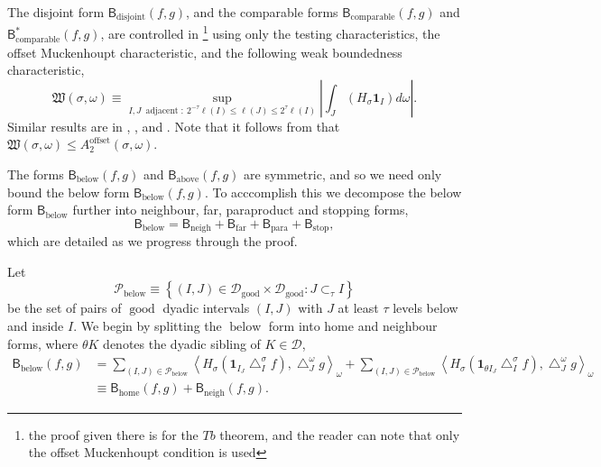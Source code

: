\documentclass{amsart}%
\theoremstyle{plain}
\numberwithin{equation}{section}
\begin{document}
The disjoint form $\mathsf{B}_{\operatorname*{disjoint}}\left(  f,g\right)  $,
and the comparable forms $\mathsf{B}_{\operatorname*{comparable}}\left(
f,g\right)  $ and $\mathsf{B}_{\operatorname*{comparable}}^{\ast}\left(
f,g\right)  $, are controlled in \cite[Section 4]{SaShUr12}\footnote{the proof
given there is for the $Tb$ theorem, and the reader can note that only the
offset Muckenhoupt condition is used} using only the testing characteristics,
the offset Muckenhoupt characteristic, and the following weak boundedness
characteristic,%
\[
\mathfrak{W}\left(  \sigma,\omega\right)  \equiv\sup
_{I,J\ \operatorname*{adjacent}:\ 2^{-\tau}\ell\left(  I\right)  \leq
\ell\left(  J\right)  \leq2^{\tau}\ell\left(  I\right)  }\left\vert \int
_{J}\left(  H_{\sigma}\mathbf{1}_{I}\right)  d\omega\right\vert .
\]
Similar results are in \cite{NTV3}, \cite{LaSaShUr3}, and \cite{Hyt2}. Note
that it follows from \cite[Lemma 2.4]{Hyt2} that $\mathfrak{W}\left(
\sigma,\omega\right)  \leq A_{2}^{\operatorname*{offset}}\left(  \sigma
,\omega\right)  $.

The forms $\mathsf{B}_{\operatorname{below}}\left(  f,g\right)  $ and
$\mathsf{B}_{\operatorname{above}}\left(  f,g\right)  $ are symmetric, and so
we need only bound the below form $\mathsf{B}_{\operatorname{below}}\left(
f,g\right)  $. To acccomplish this we decompose the below form $\mathsf{B}%
_{\operatorname{below}}$ further into neighbour, far, paraproduct and stopping
forms,%
\[
\mathsf{B}_{\operatorname{below}}=\mathsf{B}_{\operatorname{neigh}}%
+\mathsf{B}_{\operatorname{far}}+\mathsf{B}_{\operatorname*{para}}%
+\mathsf{B}_{\operatorname*{stop}},
\]
which are detailed as we progress through the proof.

Let%
\[
\mathcal{P}_{\operatorname{below}}\equiv\left\{  \left(  I,J\right)
\in\mathcal{D}_{\operatorname{good}}\times\mathcal{D}_{\operatorname{good}%
}:J\subset_{\tau}I\right\}
\]
be the set of pairs of $\operatorname{good}$ dyadic intervals $\left(
I,J\right)  $ with $J$ at least $\tau$ levels below and inside $I$. We begin
by splitting the $\operatorname{below}$ form into home and neighbour forms,
where $\theta K$ denotes the dyadic sibling of $K\in\mathcal{D}$,%
\begin{align*}
\mathsf{B}_{\operatorname{below}}\left(  f,g\right)   & =\sum_{\left(
I,J\right)  \in\mathcal{P}_{\operatorname{below}}}\left\langle H_{\sigma
}\left(  \mathbf{1}_{I_{J}}\bigtriangleup_{I}^{\sigma}f\right)
,\bigtriangleup_{J}^{\omega}g\right\rangle _{\omega}+\sum_{\left(  I,J\right)
\in\mathcal{P}_{\operatorname{below}}}\left\langle H_{\sigma}\left(
\mathbf{1}_{\theta I_{J}}\bigtriangleup_{I}^{\sigma}f\right)  ,\bigtriangleup
_{J}^{\omega}g\right\rangle _{\omega}\\
& \equiv\mathsf{B}_{\operatorname{home}}\left(  f,g\right)  +\mathsf{B}%
_{\operatorname{neigh}}\left(  f,g\right)  .
\end{align*}
\end{document}
